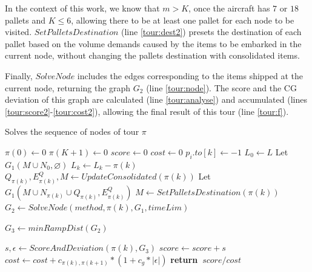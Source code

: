 \documentclass[preprint,authoryear]{elsarticle}
\renewcommand{\Return}{\State \bf {return}~}
\begin{document}
In the context of this work, we know that $m>K$, once the aircraft has $7$\/ or $18$\/ pallets and $K\leq 6$, allowing there to be at least one pallet for each node to be visited. $SetPalletsDestination$\/ (line \ref{tour:dest2}) presets the destination of each pallet based on the volume demands caused by the items to be embarked in the current node, without changing the pallets destination with consolidated items.

Finally, $SolveNode$\/ includes the edges corresponding to the items shipped at the current node, returning the graph $G_2$\/ (line \ref{tour:node}). The score and the CG deviation of this graph are calculated (line \ref{tour:analyse}) and accumulated (lines \ref{tour:score2}-\ref{tour:cost2}), allowing the final result of this tour (line \ref{tour:f}).

\begin{algorithm}[H]
	\caption{ Solves the sequence of nodes of tour $\pi$ }  \label{alg:tour}
	
	\begin{algorithmic}[1]
		
		
		\State $\pi(0) \gets 0$ \label{tour:pi1}
		\State $\pi(K+1) \gets 0$ \label{tour:pi2}
		\State $score \gets 0$ \label{tour:score}
		\State $cost \gets 0$ \label{tour:cost}
		 \label{tour:loop1}		
				\State $p_i.to[k] \gets -1$ \label{tour:-1} 
			\EndFor	
				\State $L_0 \gets L$
				\State Let $G_1(M \cup N_0, \varnothing)$ \label{tour:g11}
			\Else
				\State $L_k \gets L_k - \pi(k)$  \label{tour:lk1}			
				\State $Q_{\pi(k)}, E^Q_{\pi(k)}, M \gets UpdateConsolidated(\pi(k))$ \label{tour:dest}			
				\State Let $G_1(M \cup N_{\pi(k)} \cup Q_{\pi(k)}, E^Q_{\pi(k)})$ \label{tour:g12}
			\EndIf  \label{tour:lk2}	
			\State $M \gets SetPalletsDestination( \pi(k) )$ \label{tour:dest2}		
			\State $G_2 \gets SolveNode(method, \pi(k), G_1, timeLim)$ \label{tour:node}
			
{\color{blue} \State	$G_3 \gets minRampDist(G_2)$  \label{tour:minRampDist} }
			
			\State $s, \epsilon \gets ScoreAndDeviation(\pi(k), G_3)$ \label{tour:analyse}
			\State $score \gets score + s$ \label{tour:score2}
			\State $cost \gets cost + c_{\pi(k),\pi(k+1)} * (1 + c_g * |\epsilon|)$ \label{tour:cost2} 
		\EndFor  \label{tour:loop2}
		\Return $score / cost$ \label{tour:f}
		
		\EndProcedure
		
	\end{algorithmic}
\end{algorithm}
\end{document}
